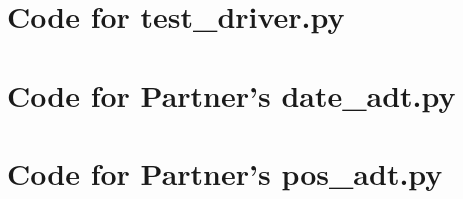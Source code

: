 \documentclass[12pt]{article}
\begin{document}
\noindent 

\newpage

\section{Code for test\_driver.py}

\noindent 

\newpage

\section{Code for Partner's date\_adt.py}

\noindent 

\newpage

\section{Code for Partner's pos\_adt.py}

\noindent 
\end{document}
